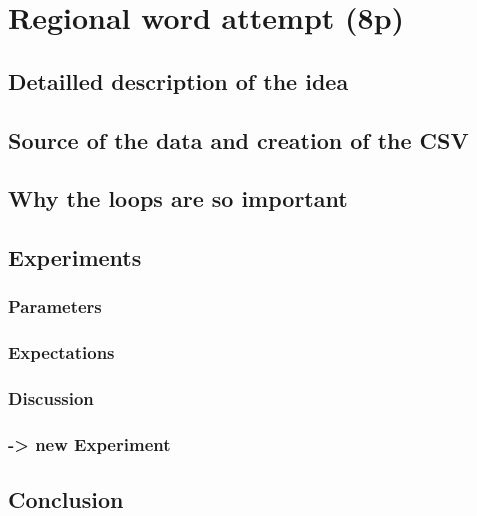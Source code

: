 \documentclass[../Main.tex]{subfiles}
\begin{document}
\section{Regional word attempt (8p)}
\subsection{Detailled description of the idea}
\subsection{Source of the data and creation of the CSV}
\subsection{Why the loops are so important}
\subsection{Experiments}
\subsubsection{Parameters}
\subsubsection{Expectations}
\subsubsection{Discussion}
\subsubsection{-> new Experiment}
\subsection{Conclusion}
\end{document}
